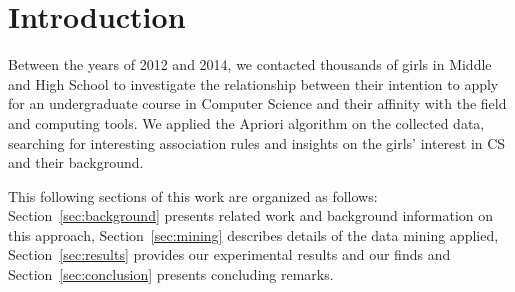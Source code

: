 \section{Introduction}\label{sec:intro}%
%

%

Between the years of 2012 and 2014, we contacted thousands of girls in Middle and High School to investigate the relationship between their intention to apply for an undergraduate course in Computer Science and their affinity with the field and computing tools. We applied the Apriori algorithm on the collected data, searching for interesting association rules and insights on the girls' interest in CS and their background.

This following sections of this work are organized as follows: Section~\ref{sec:background} presents related work and background information on this approach, Section~\ref{sec:mining} describes details of the data mining applied, Section~\ref{sec:results} provides our experimental results and our finds and Section~\ref{sec:conclusion} presents concluding remarks.
